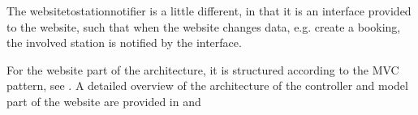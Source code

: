 The websitetostationnotifier is a little different, in that it is an interface provided to the website, such that when the website changes data, e.g. create a booking, the involved station is notified by the interface.

For the website part of the architecture, it is structured according to the MVC pattern, see .
A detailed overview of the architecture of the controller and model part of the website are provided in  and 


